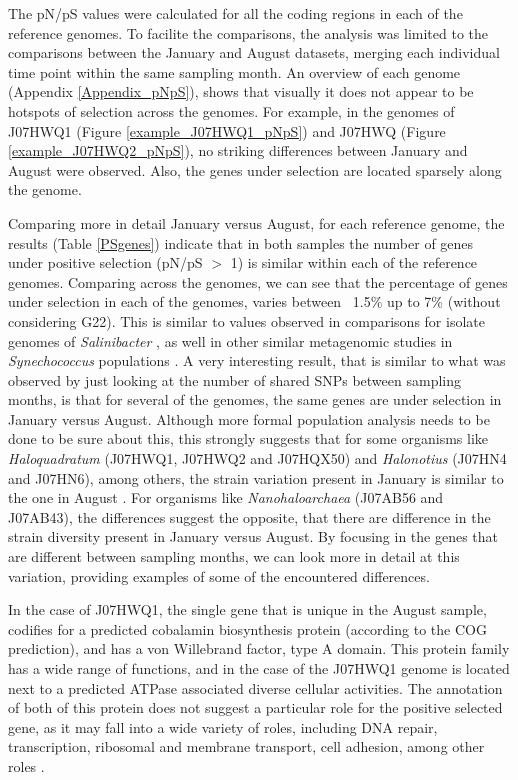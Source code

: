 The pN/pS values were calculated for all the coding regions in each of the reference genomes. To facilite the comparisons, the analysis was limited to the comparisons between the January and August datasets, merging each individual time point within the same sampling month. An overview of each genome (Appendix \ref{Appendix_pNpS}), shows that visually it does not appear to be hotspots of selection across the genomes. For example, in the genomes of J07HWQ1 (Figure \ref{example_J07HWQ1_pNpS}) and J07HWQ (Figure \ref{example_J07HWQ2_pNpS}), no striking differences between January and August were observed. Also, the genes under selection are located sparsely along the genome.

Comparing more in detail January versus August, for each reference genome, the results (Table \ref{PSgenes}) indicate that in both samples the number of genes under positive selection (pN/pS $>$ 1) is similar within each of the reference genomes. Comparing across the genomes, we can see that the percentage of genes under selection in each of the genomes, varies between ~1.5\% up to 7\% (without considering G22). This is similar to values observed in comparisons for isolate genomes of \textit{Salinibacter} \cite{PeNtildeA:2010ie}, as well in other similar metagenomic studies in \textit{Synechococcus} populations \cite{Tai:2011jo}. A very interesting result, that is similar to what was observed by just looking at the number of shared SNPs between sampling months, is that for several of the genomes, the same genes are under selection in January versus August. Although more formal population analysis needs to be done to be sure about this, this strongly suggests that for some organisms like \textit{Haloquadratum} (J07HWQ1, J07HWQ2 and J07HQX50) and \textit{Halonotius} (J07HN4 and J07HN6), among others, the strain variation present in January is similar to the one in August \cite{Vos:2011ux}. For organisms like \textit{Nanohaloarchaea} (J07AB56 and J07AB43), the differences suggest the opposite, that there are difference in the strain diversity present in January versus August. By focusing in the genes that are different between sampling months, we can look more in detail at this variation, providing examples of some of the encountered differences.

In the case of J07HWQ1, the single gene that is unique in the August sample, codifies for a predicted cobalamin biosynthesis protein (according to the COG prediction), and has a von Willebrand factor, type A domain. This protein family has a wide range of functions, and in the case of the J07HWQ1 genome is located next to a predicted ATPase associated diverse cellular activities. The annotation of both of this protein does not suggest a particular role for the positive selected gene, as it may fall into a wide variety of roles, including DNA repair, transcription, ribosomal and membrane transport, cell adhesion, among other roles \cite{Whittaker:2002ug,Makarova:2010bi}.

